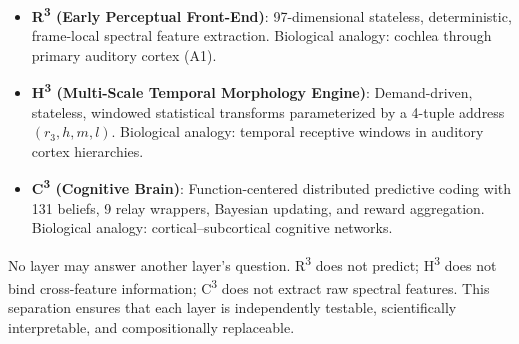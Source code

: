 \documentclass[10pt,twocolumn]{article}
\newcommand{\Rcube}{R\textsuperscript{3}}
\newcommand{\Hcube}{H\textsuperscript{3}}
\newcommand{\Ccube}{C\textsuperscript{3}}
\begin{document}
\begin{itemize}[leftmargin=*,nosep]
    \item \textbf{\Rcube{} (Early Perceptual Front-End)}: 97-dimensional stateless, deterministic, frame-local spectral feature extraction. Biological analogy: cochlea through primary auditory cortex (A1).
    \item \textbf{\Hcube{} (Multi-Scale Temporal Morphology Engine)}: Demand-driven, stateless, windowed statistical transforms parameterized by a 4-tuple address $(r_3, h, m, l)$. Biological analogy: temporal receptive windows in auditory cortex hierarchies.
    \item \textbf{\Ccube{} (Cognitive Brain)}: Function-centered distributed predictive coding with 131 beliefs, 9 relay wrappers, Bayesian updating, and reward aggregation. Biological analogy: cortical--subcortical cognitive networks.
\end{itemize}

No layer may answer another layer's question.
\Rcube{} does not predict; \Hcube{} does not bind cross-feature information; \Ccube{} does not extract raw spectral features.
This separation ensures that each layer is independently testable, scientifically interpretable, and compositionally replaceable.
\end{document}
